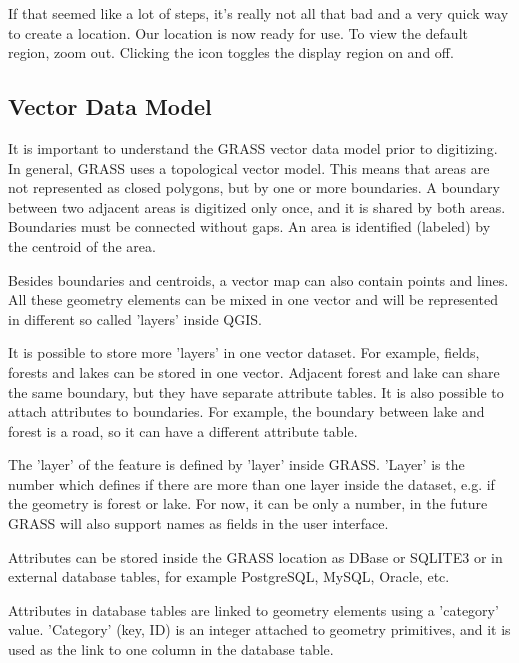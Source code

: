 If that seemed like a lot of steps, it's really not all that bad and a very 
quick way to create a location. Our location is now ready for use. To view 
the default region, zoom out. Clicking the  icon toggles the display region on and off. 

\subsection{Vector Data Model}\label{label_vectmodel}

It is important to understand the GRASS vector data model prior to
digitizing. In general, GRASS uses a topological
vector model. This means that areas are not represented
as closed polygons, but by one or more boundaries. A boundary between two
adjacent areas is digitized only once, and it is shared by both areas.
Boundaries must be connected without gaps. An area is identified (labeled) by
the centroid of the area.

Besides boundaries and centroids, a vector map can also contain
points and lines. All these geometry elements can be mixed
in one vector and will be represented in different so called 'layers' inside
QGIS.

It is possible to store more 'layers' in one vector dataset. For example,
fields, forests and lakes can be stored in one vector. Adjacent
forest and lake can share the same boundary, but they have separate attribute
tables. It is also possible to attach attributes to boundaries. For example,
the boundary between lake and forest is a road, so it can have a different 
attribute table.
 
The 'layer' of the feature is defined by 'layer' inside GRASS.
'Layer' is the number which defines if there are more than one layer inside the 
dataset, e.g. if the geometry is forest or lake.
For now, it can be only a number, in the future GRASS will also support  
names as fields in the user interface.

Attributes can be stored inside the GRASS location as DBase or SQLITE3 or in
external database tables, for example PostgreSQL, MySQL, Oracle,
etc.

Attributes in database tables are linked to geometry elements using
a 'category' value. 'Category' (key, ID) is an
integer attached to geometry primitives, and it is used as the link to one
column in the database table.

